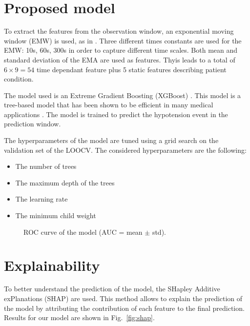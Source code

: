 \documentclass[a4paper,12pt]{article}
\begin{document}
\section{Proposed model}

To extract the features from the observation window, an exponential moving window (EMW) is used, as in \cite{lundbergExplainableMachinelearningPredictions2018}. Three different times constants are used for the EMW: 10s, 60s, 300s in order to capture different time scales. Both mean and standard deviation of the EMA are used as features. Thyis leads to a total of $6 \times 9 = 54$ time dependant feature plus 5 static features describing patient condition. \medskip

The model used is an Extreme Gradient Boosting (XGBoost) \cite{chenXGBoostScalableTree2016}. This model is a tree-based model that has been shown to be efficient in many medical applications \cite{chenXGBoostScalableTree2016}. The model is trained to predict the hypotension event in the prediction window. \medskip

The hyperparameters of the model are tuned using a grid search on the validation set of the LOOCV. The considered hyperparameters are the following:
\begin{itemize}
    \item The number of trees
    \item The maximum depth of the trees
    \item The learning rate
    \item The minimum child weight
\end{itemize}

\begin{figure}[h]
    \centering
    
    \caption{ROC curve of the model (AUC = mean $\pm$ std).}
    \label{fig:roc}
\end{figure}

\section{Explainability}

To better understand the prediction of the model, the SHapley Additive exPlanations (SHAP) \cite{lundbergExplainableMachinelearningPredictions2018} are used. This method allows to explain the prediction of the model by attributing the contribution of each feature to the final prediction. Results for our model are shown in Fig.~\ref{fig:shap}.
\end{document}
